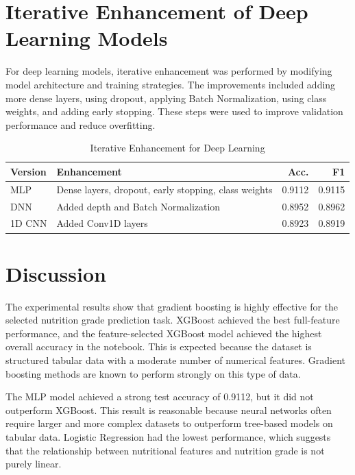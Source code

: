 \documentclass[conference]{IEEEtran}
\begin{document}
\section{Iterative Enhancement of Deep Learning Models}
For deep learning models, iterative enhancement was performed by modifying model architecture and training strategies. The improvements included adding more dense layers, using dropout, applying Batch Normalization, using class weights, and adding early stopping. These steps were used to improve validation performance and reduce overfitting.

\begin{table}[htbp]
\caption{Iterative Enhancement for Deep Learning}
\begin{center}
\begin{tabular}{llrr}
\toprule
\textbf{Version} & \textbf{Enhancement} & \textbf{Acc.} & \textbf{F1} \\
\midrule
MLP & Dense layers, dropout, early stopping, class weights & 0.9112 & 0.9115 \\
DNN & Added depth and Batch Normalization & 0.8952 & 0.8962 \\
1D CNN & Added Conv1D layers & 0.8923 & 0.8919 \\
\bottomrule
\end{tabular}
\label{tab:dl-enhancement}
\end{center}
\end{table}

\section{Discussion}
The experimental results show that gradient boosting is highly effective for the selected nutrition grade prediction task. XGBoost achieved the best full-feature performance, and the feature-selected XGBoost model achieved the highest overall accuracy in the notebook. This is expected because the dataset is structured tabular data with a moderate number of numerical features. Gradient boosting methods are known to perform strongly on this type of data.

The MLP model achieved a strong test accuracy of 0.9112, but it did not outperform XGBoost. This result is reasonable because neural networks often require larger and more complex datasets to outperform tree-based models on tabular data. Logistic Regression had the lowest performance, which suggests that the relationship between nutritional features and nutrition grade is not purely linear.
\end{document}

